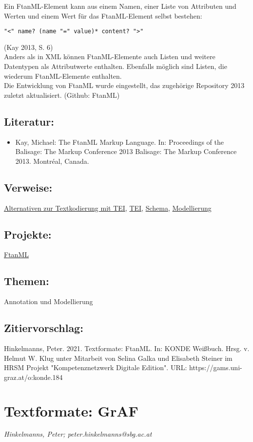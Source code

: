 \documentclass{article}
\begin{document}
        Ein FtanML-Element kann aus einem Namen, einer Liste von Attributen und Werten und einem Wert für das FtanML-Element selbst bestehen:\\
            
        \begin{verbatim}"<" name? (name "=" value)* content? ">"\end{verbatim}(Kay 2013, S. 6)\\
            
        Anders als in XML können FtanML-Elemente auch Listen und weitere Datentypen als Attributwerte enthalten. Ebenfalls möglich sind Listen, die wiederum FtanML-Elemente enthalten.\\
            
        Die Entwicklung von FtanML wurde eingestellt, das zugehörige Repository 2013 zuletzt aktualisiert. (Github: FtanML)\\
            
        \subsection*{Literatur:}\begin{itemize}\item Kay, Michael: The FtanML Markup Language. In: Proceedings of the Balisage: The Markup Conference 2013 Balisage: The Markup Conference 2013. Montréal, Canada.\end{itemize}\subsection*{Verweise:}\href{https://gams.uni-graz.at/o:konde.15}{Alternativen zur Textkodierung mit TEI}, \href{https://gams.uni-graz.at/o:konde.178}{TEI}, \href{https://gams.uni-graz.at/o:konde.166}{Schema}, \href{https://gams.uni-graz.at/o:konde.137}{Modellierung}\subsection*{Projekte:}\href{https://github.com/FtanML-WG}{FtanML}\subsection*{Themen:}Annotation und Modellierung\subsection*{Zitiervorschlag:}Hinkelmanns, Peter. 2021. Textformate: FtanML. In: KONDE Weißbuch. Hrsg. v. Helmut W. Klug unter Mitarbeit von Selina Galka und Elisabeth Steiner im HRSM Projekt "Kompetenznetzwerk Digitale Edition". URL: https://gams.uni-graz.at/o:konde.184\newpage\section*{Textformate: GrAF} \emph{Hinkelmanns, Peter; peter.hinkelmanns@sbg.ac.at }\\
        
\end{document}
